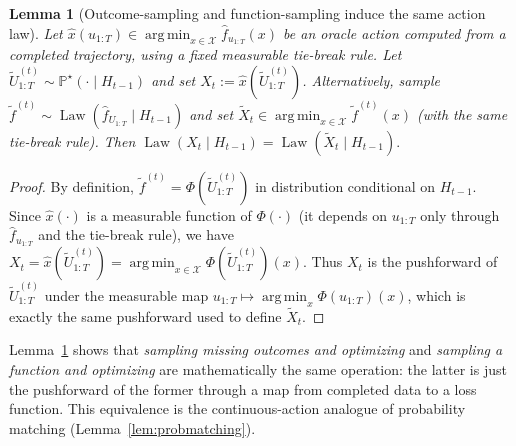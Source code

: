 \documentclass[11pt]{article}
\newtheorem{lemma}{Lemma}
\renewcommand{\P}{\mathbb{P}}
\DeclareMathOperator*{\argmin}{arg\,min}
\DeclareMathOperator{\Law}{Law}
\providecommand{\cX}{\mathcal{X}}
\begin{document}
\begin{lemma}[Outcome-sampling and function-sampling induce the same action law]
\label{lem:outcome-vs-function}
Let $\hat x(u_{1:T}) \in \argmin_{x\in\cX}\widehat f_{u_{1:T}}(x)$ be an oracle action computed from a completed
trajectory, using a fixed measurable tie-break rule.
Let $\widetilde U_{1:T}^{(t)} \sim \P^\star(\cdot\mid H_{t-1})$ and set
$X_t := \hat x(\widetilde U_{1:T}^{(t)})$.
Alternatively, sample $\widetilde f^{(t)}\sim \Law(\widehat f_{U_{1:T}}\mid H_{t-1})$ and set
$\widetilde X_t\in \argmin_{x\in\cX}\widetilde f^{(t)}(x)$ (with the same tie-break rule).
Then
\(
\Law(X_t\mid H_{t-1})=\Law(\widetilde X_t\mid H_{t-1}).
\)
\end{lemma}

\begin{proof}
By definition, $\widetilde f^{(t)}=\Phi(\widetilde U_{1:T}^{(t)})$ in distribution conditional on $H_{t-1}$.
Since $\hat x(\cdot)$ is a measurable function of $\Phi(\cdot)$ (it depends on $u_{1:T}$ only through
$\widehat f_{u_{1:T}}$ and the tie-break rule), we have
\(
X_t=\hat x(\widetilde U_{1:T}^{(t)}) = \argmin_{x\in\cX}\Phi(\widetilde U_{1:T}^{(t)})(x).
\)
Thus $X_t$ is the pushforward of $\widetilde U_{1:T}^{(t)}$ under the measurable map
$u_{1:T}\mapsto \argmin_x \Phi(u_{1:T})(x)$, which is exactly the same pushforward used to define $\widetilde X_t$.
\end{proof}



Lemma~\ref{lem:outcome-vs-function} shows that \emph{sampling missing outcomes and optimizing} and
\emph{sampling a function and optimizing} are mathematically the same operation: the latter is just the
pushforward of the former through a map from completed data to a loss function.
This equivalence is the continuous-action analogue of probability matching
(Lemma~\ref{lem:probmatching}).
\end{document}
